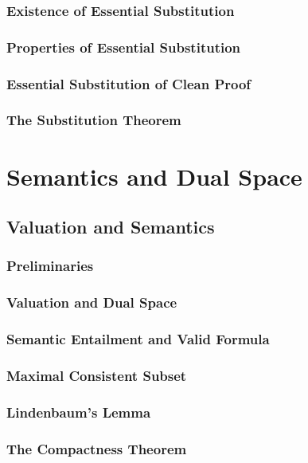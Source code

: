 \documentclass{report}
\begin{document}
    \subsection{Existence of Essential Substitution}
    \subsection{Properties of Essential Substitution}
    \subsection{Essential Substitution of Clean Proof}
    \subsection{The Substitution Theorem}
\chapter{Semantics and Dual Space}
\section{Valuation and Semantics}
    \subsection{Preliminaries}
    \subsection{Valuation and Dual Space}
    \subsection{Semantic Entailment and Valid Formula}
    \subsection{Maximal Consistent Subset}
    \subsection{Lindenbaum's Lemma}
    \subsection{The Compactness Theorem}
\end{document}
